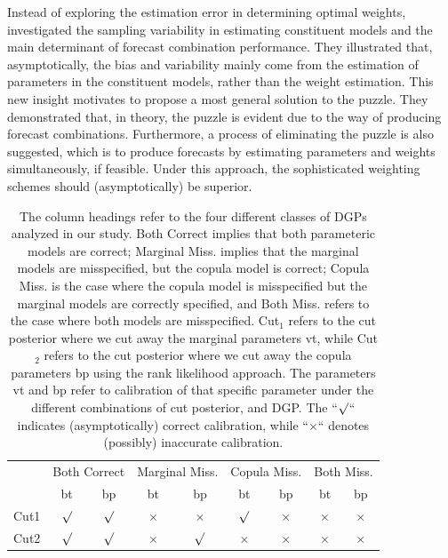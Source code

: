 \documentclass{monashthesis}
\begin{document}
Instead of exploring the estimation error in determining optimal weights, \textcite{ZMFP22} investigated the sampling variability in estimating constituent models and the main determinant of forecast combination performance. They illustrated that, asymptotically, the bias and variability mainly come from the estimation of parameters in the constituent models, rather than the weight estimation. This new insight motivates \textcite{FZMP23} to propose a most general solution to the puzzle. They demonstrated that, in theory, the puzzle is evident due to the way of producing forecast combinations. Furthermore, a process of eliminating the puzzle is also suggested, which is to produce forecasts by estimating parameters and weights simultaneously, if feasible. Under this approach, the sophisticated weighting schemes should (asymptotically) be superior.

\begin{table}[ht]
\centering
\begin{tabular}{lcccccccc}
\toprule
&
\multicolumn{2}{c}{Both Correct} &
\multicolumn{2}{c}{Marginal Miss. } &
\multicolumn{2}{c}{Copula Miss. } &
\multicolumn{2}{c}{Both Miss. }
\\

& {bt} & {bp} & {bt} & {bp} & {bt} & {bp} & {bt} & {bp} \\
\midrule
Cut1 & $\surd$ & $\surd$ & $\times$ & $\times$ & $\surd$ & $\times$ & $\times$ & $\times$ \\
Cut2 & $\surd$ & $\surd$ & $\times$ & $\surd$ & $\times$ & $\times$ & $\times$ & $\times$ \\

\bottomrule
\end{tabular}
\caption{The column headings refer to the four different classes of DGPs analyzed in our study. Both Correct implies that both parameteric models are correct; Marginal Miss. implies that the marginal models are misspecified, but the copula model is correct; Copula Miss. is the case where the copula model is misspecified but the marginal models are correctly specified, and Both Miss. refers to the case where both models are misspecified. Cut$_1$ refers to the cut posterior where we cut away the marginal parameters vt, while Cut$_2$ refers to the cut posterior where we cut away the copula parameters bp using the rank likelihood approach. The parameters vt and bp refer to calibration of that specific parameter  under the different combinations of cut posterior, and DGP. The ``$\surd$`` indicates (asymptotically) correct calibration, while ``$\times$`` denotes (possibly) inaccurate calibration.}
\label{tab:1}
\end{table}
\end{document}
